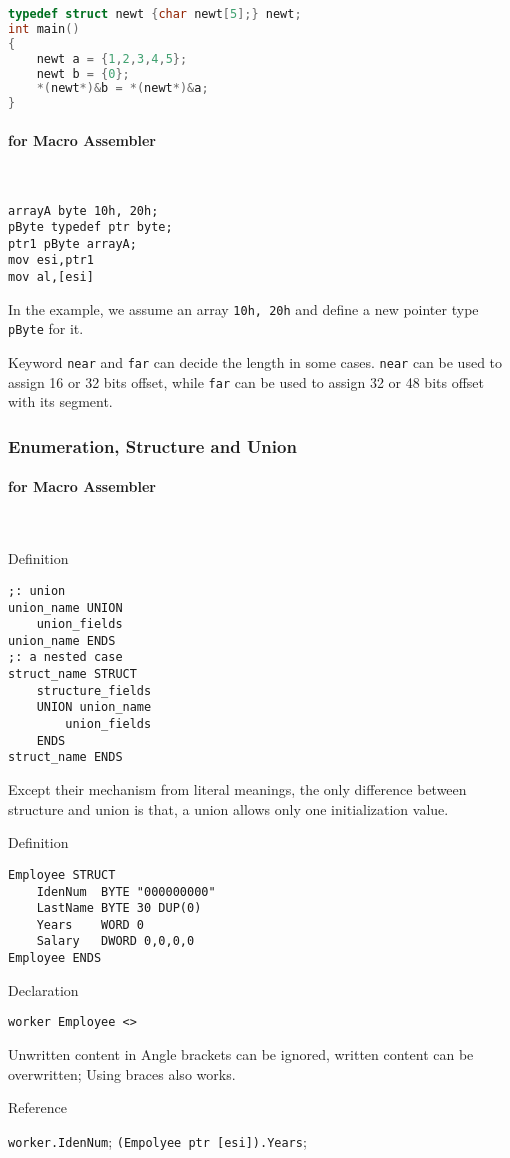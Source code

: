 \begin{lstlisting}[language=C]
typedef struct newt {char newt[5];} newt;
int main()
{
	newt a = {1,2,3,4,5};
	newt b = {0};
	*(newt*)&b = *(newt*)&a;
}
\end{lstlisting}

\paragraph{for Macro Assembler} \

\lstset{style=GlobalASMx86}
\begin{lstlisting}[language={[x86masm]Assembler}]
arrayA byte 10h, 20h;
pByte typedef ptr byte;
ptr1 pByte arrayA;
mov esi,ptr1
mov al,[esi]
\end{lstlisting}

In the example, we assume an array \verb|10h, 20h| and define a new pointer type \verb|pByte| for it. 

Keyword \verb`near` and \verb`far` can decide the length in some cases.
\verb`near` can be used to assign 16 or 32 bits offset,
while \verb`far` can be used to assign 32 or 48 bits offset with its segment.


\subsubsection{Enumeration, Structure and Union}

\paragraph{for Macro Assembler} \

{Definition}
\begin{lstlisting}[language={[x86masm]Assembler}]
;: union
union_name UNION
	union_fields
union_name ENDS
;: a nested case
struct_name STRUCT
	structure_fields
	UNION union_name
		union_fields
	ENDS
struct_name ENDS
\end{lstlisting}

Except their mechanism from literal meanings, the only difference between structure and union is that, a union allows only one initialization value.


{Definition}
\begin{lstlisting}[language={[x86masm]Assembler}]
Employee STRUCT
	IdenNum  BYTE "000000000"
	LastName BYTE 30 DUP(0)
	Years    WORD 0
	Salary   DWORD 0,0,0,0
Employee ENDS
\end{lstlisting}

{Declaration}
\begin{lstlisting}[language={[x86masm]Assembler}]
worker Employee <>
\end{lstlisting}

Unwritten content in Angle brackets can be ignored, written content can be overwritten; Using braces also works.

{Reference}

\verb|worker.IdenNum|; \verb|(Empolyee ptr [esi]).Years|;




